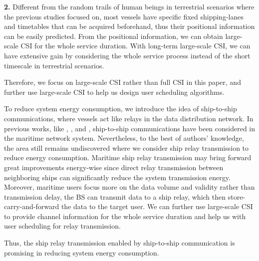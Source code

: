 \documentclass[conference]{IEEEtran}
\begin{document}
 \textbf{2.} Different from the random trails of human beings in terrestrial scenarios where the previous studies focused on, most vessels have specific fixed shipping-lanes and timetables that can be acquired beforehand, thus their positional information can be easily predicted. From the positional information, we can obtain large-scale CSI for the whole service duration. With long-term large-scale CSI, we can have extensive gain by considering the whole service process instead of the short timescale in terrestrial scenarios. 
 
 Therefore, we focus on large-scale CSI rather than full CSI in this paper, and further use large-scale CSI to help us design user scheduling algorithms.
 
 To reduce system energy consumption, we introduce the idea of ship-to-ship communications, where vessels act like relays in the data distribution network. In previous works, like \cite{p321}, \cite{p32}, and \cite{p410}, ship-to-ship communications have been considered in the maritime network system. Nevertheless, to the best of authors' knowledge, the area still remains undiscovered where we consider ship relay transmission to reduce energy consumption. Maritime ship relay transmission may bring forward great improvements energy-wise since direct relay transmission between neighboring ships can significantly reduce the system transmission energy. 
 Moreover, maritime users focus more on the data volume and validity rather than transmission delay, the BS can transmit data to a ship relay, which then store-carry-and-forward the data to the target user. We can further use large-scale CSI to provide channel information for the whole service duration and help us with user scheduling for relay transmission.
 
 Thus, the ship relay transmission enabled by ship-to-ship communication is promising in reducing system energy consumption. 
 
 
\end{document}
